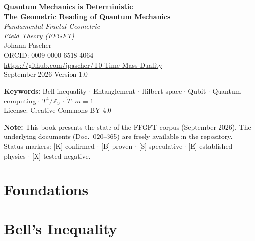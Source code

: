 \documentclass[11pt,oneside]{book}
\begin{document}
\frontmatter
\pagestyle{fancy}
\makeatletter\let\ps@plain\ps@fancy\makeatother
\begin{titlepage}
  \centering\vspace*{1.5cm}
  {\Huge\bfseries\color{blue!70!black}Quantum Mechanics is Deterministic}\\[0.6cm]
  {\Large\bfseries\color{blue!40!black}The Geometric Reading of Quantum Mechanics}\\[1cm]
  {\LARGE\itshape Fundamental Fractal Geometric\\[0.2cm]Field Theory (FFGFT)}\\[2cm]
  {\large Johann Pascher}\\[0.3cm]
  {\normalsize ORCID: 0009-0000-6518-4064}\\[0.3cm]
  {\normalsize\url{https://github.com/jpascher/T0-Time-Mass-Duality}}\\[1.5cm]
  {\normalsize September 2026}\vfill
  {\small Version 1.0}
\end{titlepage}
\newpage\thispagestyle{empty}%
{\small\noindent\textbf{Keywords:} Bell inequality $\cdot$ Entanglement $\cdot$ Hilbert space $\cdot$ Qubit $\cdot$ Quantum computing $\cdot$ $T^4/\mathbb{Z}_3$ $\cdot$ $\tilde T\cdot m=1$\\[0.8em]
\noindent License: Creative Commons BY 4.0}\par\vspace{1em}
{\small\noindent\textbf{Note:} This book presents the state of the FFGFT corpus (September 2026). The underlying documents (Doc.~020--365) are freely available in the repository. Status markers: [K] confirmed $\cdot$ [B] proven $\cdot$ [S] speculative $\cdot$ [E] established physics $\cdot$ [X] tested negative.}
\tableofcontents
\mainmatter

\part{Foundations}




\part{Bell's Inequality}





\end{document}
